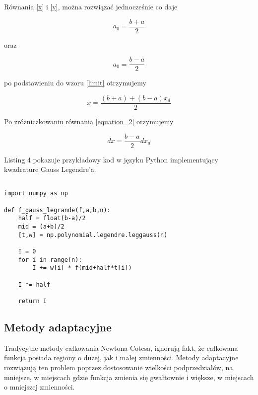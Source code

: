 \documentclass[12pt,twoside]{article}
\begin{document}
Równania \eqref{x} i \eqref{y}, można rozwiązać jednocześnie co daje

\begin{equation}
a_0 = \frac{b+a}{2}
\end{equation}

oraz

\begin{equation}
a_0 = \frac{b-a}{2}
\end{equation}

po podstawieniu do wzoru \eqref{limit} otrzymujemy

\begin{equation}
x = \frac{(b+a)+(b-a)x_d}{2}
\label{equation_2}
\end{equation}

Po zróżniczkowaniu równania \eqref{equation_2} orzymujemy

\begin{equation}
dx = \frac{b-a}{2} dx_d
\end{equation}


\cite{limits_of_int}


Listing 4 pokazuje przykładowy kod w języku Python implementujący kwadrature Gauss Legendre'a.

\begin{lstlisting}[caption={Kod w języku python implementujący metodę simpsona}]

import numpy as np

def f_gauss_legrande(f,a,b,n):
    half = float(b-a)/2
    mid = (a+b)/2
    [t,w] = np.polynomial.legendre.leggauss(n)

    I = 0
    for i in range(n):
        I += w[i] * f(mid+half*t[i])

    I *= half

    return I

\end{lstlisting}
\label{Listing 4}

\subsection{Metody adaptacyjne}

Tradycyjne metody całkowania Newtona-Cotesa, ignorują fakt, że całkowana funkcja posiada regiony o dużej, jak i małej zmienności.
Metody adaptacyjne rozwiązują ten problem poprzez dostosowanie wielkości podprzedziałów, na mniejsze, w miejscach gdzie funkcja zmienia się gwałtownie i większe, w miejscach o mniejszej zmienności.\cite{adaptive}
\end{document}
